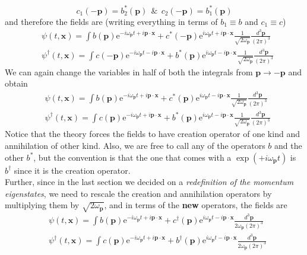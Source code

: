 \documentclass[11pt, notitlepage]{report}
\newcommand{\e}{\mathrm{e}}
\newcommand{\w}{\omega}
\numberwithin{equation}{section}
\begin{document}
{        \begin{equation*}
          c_1(-\textbf{p}) = b_2^*(\textbf{p})~~\&~~ c_2(-\textbf{p}) = b_1^*(\textbf{p})
        \end{equation*}
        and therefore the fields are (writing everything in terms of \(b_1\equiv b\) and \(c_1\equiv c\))
        \begin{align*}
            &\psi(t, \textbf{x}) = \int b(\textbf{p}) \e^{-i\w_\textbf{p}t + i\textbf{p}\cdot \textbf{x}} + c^*(-\textbf{p})\e^{i\w_\textbf{p}t + i\textbf{p}\cdot \textbf{x}} \frac{1}{\sqrt{2\w_\textbf{p}}}\frac{d^3\textbf{p}}{(2\pi)^3}\\
            &\psi^\dagger(t, \textbf{x}) = \int c(-\textbf{p}) \e^{-i\w_\textbf{p}t - i\textbf{p}\cdot \textbf{x}} + b^*(\textbf{p})\e^{i\w_\textbf{p}t - i\textbf{p}\cdot \textbf{x}} \frac{1}{\sqrt{2\w_\textbf{p}}}\frac{d^3\textbf{p}}{(2\pi)^3}
        \end{align*}
        We can again change the variables in half of both the integrals from \(\textbf{p}\to-\textbf{p}\) and obtain 
        \begin{align*}
            &\psi(t, \textbf{x}) = \int b(\textbf{p}) \e^{-i\w_\textbf{p}t + i\textbf{p}\cdot \textbf{x}} + c^*(\textbf{p})\e^{i\w_\textbf{p}t - i\textbf{p}\cdot \textbf{x}} \frac{1}{\sqrt{2\w_\textbf{p}}}\frac{d^3\textbf{p}}{(2\pi)^3}\\
            &\psi^\dagger(t, \textbf{x}) = \int c(\textbf{p}) \e^{-i\w_\textbf{p}t + i\textbf{p}\cdot \textbf{x}} + b^*(\textbf{p})\e^{i\w_\textbf{p}t - i\textbf{p}\cdot \textbf{x}} \frac{1}{\sqrt{2\w_\textbf{p}}}\frac{d^3\textbf{p}}{(2\pi)^3}
        \end{align*}
        Notice that the theory forces the fields to have creation operator of one kind and annihilation of other kind. Also, we are free to call any of the operators \(b\) and the other \(b^*\), but the convention is that the one that comes with a \(\exp(+i\w_\textbf{p} t)\) is \(b^\dagger\) since it is the creation operator.\vspace{7pt}\\
        Further, since in the last section we decided on a \textit{redefinition of the momentum eigenstates}, we need to rescale the creation and annihilation operators by multiplying them by \(\sqrt{2\w_\textbf{p}}\), and in terms of the \textbf{new} operators, the fields are 
        \begin{align*}
            &\psi(t, \textbf{x}) = \int b(\textbf{p}) \e^{-i\w_\textbf{p}t + i\textbf{p}\cdot \textbf{x}} + c^\dagger(\textbf{p})\e^{i\w_\textbf{p}t - i\textbf{p}\cdot \textbf{x}} \frac{d^3\textbf{p}}{2\w_\textbf{p}(2\pi)^3}\\
            &\psi^\dagger(t, \textbf{x}) = \int c(\textbf{p}) \e^{-i\w_\textbf{p}t + i\textbf{p}\cdot \textbf{x}} + b^\dagger(\textbf{p})\e^{i\w_\textbf{p}t - i\textbf{p}\cdot \textbf{x}} \frac{d^3\textbf{p}}{2\w_\textbf{p}(2\pi)^3}
        \end{align*}
    }
\end{document}
